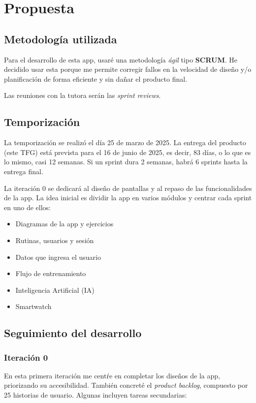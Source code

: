 \chapter{Propuesta}

\section{Metodolog\'ia utilizada}
Para el desarrollo de esta app, usar\'e una metodolog\'ia \textit{\'agil} tipo \textbf{SCRUM}. He decidido usar esta porque me permite corregir fallos en la velocidad de dise\~no y/o planificaci\'on de forma eficiente y sin da\~nar el producto final.

Las reuniones con la tutora ser\'an las \textit{sprint reviews}.

\section{Temporizaci\'on}
La temporizaci\'on se realiz\'o el d\'ia 25 de marzo de 2025. La entrega del producto (este TFG) est\'a prevista para el 16 de junio de 2025, es decir, 83 d\'ias, o lo que es lo mismo, casi 12 semanas. Si un sprint dura 2 semanas, habr\'a 6 sprints hasta la entrega final.

La iteraci\'on 0 se dedicar\'a al dise\~no de pantallas y al repaso de las funcionalidades de la app. La idea inicial es dividir la app en varios m\'odulos y centrar cada sprint en uno de ellos:

\begin{itemize}
  \item Diagramas de la app y ejercicios
  \item Rutinas, usuarios y sesi\'on
  \item Datos que ingresa el usuario
  \item Flujo de entrenamiento
  \item Inteligencia Artificial (IA)
  \item Smartwatch
\end{itemize}

\section{Seguimiento del desarrollo}

\subsection*{Iteraci\'on 0}
En esta primera iteraci\'on me cent\'re en completar los dise\~nos de la app, priorizando su accesibilidad. Tambi\'en concret\'e el \textit{product backlog}, compuesto por 25 historias de usuario. Algunas incluyen tareas secundarias:

